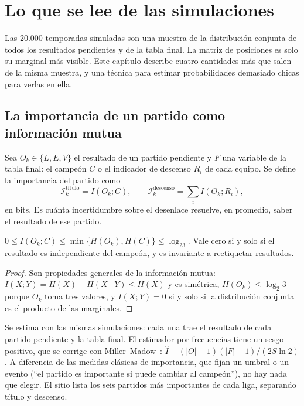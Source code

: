 \chapter{Lo que se lee de las simulaciones}
\label{cap:lectura}

Las 20.000 temporadas simuladas son una muestra de la distribución conjunta de todos los resultados pendientes y de la tabla final. La matriz de posiciones es solo su marginal más visible. Este capítulo describe cuatro cantidades más que salen de la misma muestra, y una técnica para estimar probabilidades demasiado chicas para verlas en ella.

\section{La importancia de un partido como información mutua}
\label{sec:mi}

Sea $O_k\in\{L,E,V\}$ el resultado de un partido pendiente y $F$ una variable de la tabla final: el campeón $C$ o el indicador de descenso $R_i$ de cada equipo. Se define la importancia del partido como
\[
\mathcal I_k^{\text{título}}=I(O_k;C),\qquad \mathcal I_k^{\text{descenso}}=\sum_i I(O_k;R_i),
\]
en bits. Es cuánta incertidumbre sobre el desenlace resuelve, en promedio, saber el resultado de ese partido.

\begin{proposicion}[Propiedades] \dem
$0\le I(O_k;C)\le\min\{H(O_k),H(C)\}\le\log_23$. Vale cero si y solo si el resultado es independiente del campeón, y es invariante a reetiquetar resultados.
\end{proposicion}

\begin{proof}
Son propiedades generales de la información mutua: $I(X;Y)=H(X)-H(X\mid Y)\le H(X)$ y es simétrica, $H(O_k)\le\log_2 3$ porque $O_k$ toma tres valores, y $I(X;Y)=0$ si y solo si la distribución conjunta es el producto de las marginales.
\end{proof}

Se estima con las mismas simulaciones: cada una trae el resultado de cada partido pendiente y la tabla final. El estimador por frecuencias tiene un sesgo positivo, que se corrige con Miller–Madow~\cite{miller1955}: $\hat I-(|O|-1)(|F|-1)/(2S\ln2)$. A diferencia de las medidas clásicas de importancia, que fijan un umbral o un evento (``el partido es importante si puede cambiar al campeón''), no hay nada que elegir. El sitio lista los seis partidos más importantes de cada liga, separando título y descenso.

